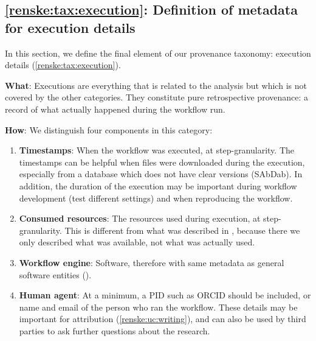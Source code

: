 \subsection{\ref{renske:tax:execution}: Definition of metadata for execution details}
\label{sec:renske:execution_reqs}

In this section, we define the final element of our provenance taxonomy: execution details (\ref{renske:tax:execution}).

\textbf{What}: Executions are everything that is related to the analysis but which is not covered by the other categories. They constitute pure retrospective provenance: a record of what actually happened during the workflow run. 

\textbf{How}: We distinguish four components in this category:

\begin{enumerate}[label=\textbf{EX\arabic*}]
    \item \textbf{Timestamps}: When the workflow was executed, at step-granularity. The timestamps can be helpful when files were downloaded during the execution, especially from a database which does not have clear versions (SAbDab). In addition, the duration of the execution may be important during workflow development (test different settings) and when reproducing the workflow. \label{renske:req:ex_time}
    \item \textbf{Consumed resources}: The resources used during execution, at step-granularity. This is different from what was described in , because there we only described what was available, not what was actually used. \label{renske:req:ex_resources}
    \item \textbf{Workflow engine}: Software, therefore with same metadata as general software entities ().\label{renske:req:ex_engine}
    \item \textbf{Human agent}: At a minimum, a PID such as ORCID should be included, or name and email of the person who ran the workflow. These details may be important for attribution (\ref{renske:uc:writing}), and can also be used by third parties to ask further questions about the research.  \label{renske:req:ex_human}
\end{enumerate}
